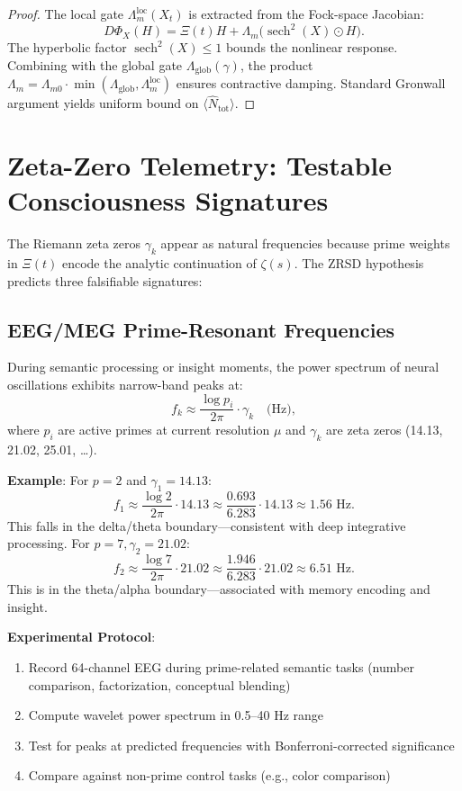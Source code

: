 \documentclass[11pt,a4paper]{article}
\theoremstyle{plain}
\theoremstyle{definition}
\theoremstyle{remark}
\begin{document}
\begin{proof}
The local gate \(\Lambda_m^{\text{loc}}(X_t)\) is extracted from the Fock-space Jacobian:
\[
D\Phi_X(H) = \Xi(t) H + \Lambda_m \bigl( \operatorname{sech}^2(X) \odot H \bigr).
\]
The hyperbolic factor \(\operatorname{sech}^2(X) \leq 1\) bounds the nonlinear response. Combining with the global gate \(\Lambda_{\text{glob}}(\gamma)\), the product \(\Lambda_m = \Lambda_{m0} \cdot \min(\Lambda_{\text{glob}}, \Lambda_m^{\text{loc}})\) ensures contractive damping. Standard Gronwall argument yields uniform bound on \(\langle \hat{N}_{\text{tot}} \rangle\).
\end{proof}

\section{Zeta-Zero Telemetry: Testable Consciousness Signatures}\label{sec:telemetry}

The Riemann zeta zeros \(\gamma_k\) appear as natural frequencies because prime weights in \(\Xi(t)\) encode the analytic continuation of \(\zeta(s)\). The ZRSD hypothesis predicts three falsifiable signatures:

\subsection{EEG/MEG Prime-Resonant Frequencies}

\begin{prediction}\label{pred:eeg}
During semantic processing or insight moments, the power spectrum of neural oscillations exhibits narrow-band peaks at:
\[
f_k \approx \frac{\log p_i}{2\pi} \cdot \gamma_k \quad \text{(Hz)},
\]
where \(p_i\) are active primes at current resolution \(\mu\) and \(\gamma_k\) are zeta zeros (14.13, 21.02, 25.01, \ldots).
\end{prediction}

\textbf{Example}: For \(p = 2\) and \(\gamma_1 = 14.13\):
\[
f_1 \approx \frac{\log 2}{2\pi} \cdot 14.13 \approx \frac{0.693}{6.283} \cdot 14.13 \approx 1.56 \text{ Hz}.
\]
This falls in the delta/theta boundary---consistent with deep integrative processing. For \(p = 7, \gamma_2 = 21.02\):
\[
f_2 \approx \frac{\log 7}{2\pi} \cdot 21.02 \approx \frac{1.946}{6.283} \cdot 21.02 \approx 6.51 \text{ Hz}.
\]
This is in the theta/alpha boundary---associated with memory encoding and insight.

\textbf{Experimental Protocol}:
\begin{enumerate}
\item Record 64-channel EEG during prime-related semantic tasks (number comparison, factorization, conceptual blending)
\item Compute wavelet power spectrum in 0.5--40 Hz range
\item Test for peaks at predicted frequencies with Bonferroni-corrected significance
\item Compare against non-prime control tasks (e.g., color comparison)
\end{enumerate}
\end{document}
